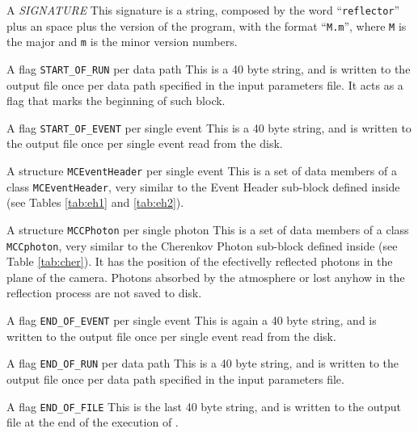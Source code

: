 \begin{Uentry}
  
\item[A \emph{SIGNATURE}]
%
  This signature is a string, composed by the word
  ``\texttt{reflector}'' plus an space plus the version of the
  program, with the format ``\texttt{M.m}'', where \texttt{M} is the
  major and \texttt{m} is the minor version numbers.

\item[A flag \texttt{START\_OF\_RUN} per data path]
%
  This is a 40 byte string, and is written to the output file once per
  data path specified in the input parameters file. It acts as a flag
  that marks the beginning of such block.

\item[A flag \texttt{START\_OF\_EVENT} per single event]
%
  This is a 40 byte string, and is written to the output file once per
  single event read from the disk.

\item[A structure \texttt{MCEventHeader} per single event]
%
  This is a set of data members of a class \texttt{MCEventHeader},
  very similar to the Event Header sub-block defined inside \CORSIKA (see
  Tables \ref{tab:eh1} and \ref{tab:eh2}).

\item[A structure \texttt{MCCPhoton} per single photon]
%
  This is a set of data members of a class \texttt{MCCphoton}, very
  similar to the Cherenkov Photon sub-block defined inside \CORSIKA
  (see Table \ref{tab:cher}). It has the position of the efectivelly
  reflected photons in the plane of the camera. Photons absorbed by
  the atmosphere or lost anyhow in the reflection process are not
  saved to disk.
  
\item[A flag \texttt{END\_OF\_EVENT} per single event]
%
  This is again a 40 byte string, and is written to the output file
  once per single event read from the disk.

\item[A flag \texttt{END\_OF\_RUN} per data path]
%
  This is a 40 byte string, and is written to the output file once per
  data path specified in the input parameters file.

\item[A flag \texttt{END\_OF\_FILE}]
%
  This is the last 40 byte string, and is written to the output file
  at the end of the execution of .

\end{Uentry}

